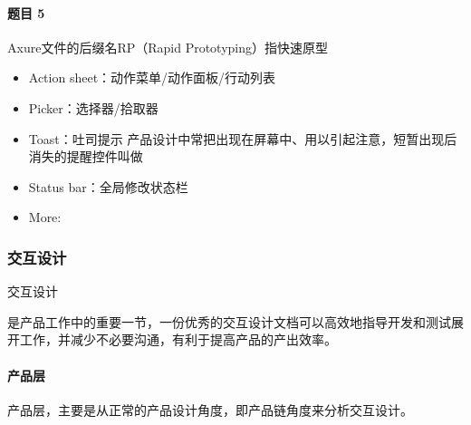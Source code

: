 \documentclass[letterpaper,11pt,english]{sphinxmanual}
\begin{document}
\paragraph{题目 5\sphinxfootnotemark[540]}
\label{\detokenize{chapter_knowledge/prototype_design:id18}}%
\begin{footnotetext}[540]\sphinxAtStartFootnote
{}
%
\end{footnotetext}\ignorespaces 
Axure文件的后缀名RP（Rapid Prototyping）指快速原型
\begin{itemize}
\item {} 
Action sheet：动作菜单/动作面板/行动列表

\item {} 
Picker：选择器/拾取器

\item {} 
Toast：吐司提示
产品设计中常把出现在屏幕中、用以引起注意，短暂出现后消失的提醒控件叫做

\item {} 
Status bar：全局修改状态栏

\item {} 
More: %
\begin{footnote}[541]\sphinxAtStartFootnote
{}
%
\end{footnote}

\end{itemize}


\subsubsection{交互设计}
\label{\detokenize{chapter_knowledge/IXD_analysis:id1}}\label{\detokenize{chapter_knowledge/IXD_analysis::doc}}
交互设计%
\begin{footnote}[542]\sphinxAtStartFootnote
{}
%
\end{footnote}是产品工作中的重要一节，一份优秀的交互设计文档可以高效地指导开发和测试展开工作，并减少不必要沟通，有利于提高产品的产出效率。%
\begin{footnote}[543]\sphinxAtStartFootnote
{}
%
\end{footnote}


\paragraph{产品层}
\label{\detokenize{chapter_knowledge/IXD_analysis:id2}}
产品层，主要是从正常的产品设计角度，即产品链角度来分析交互设计。
\end{document}
